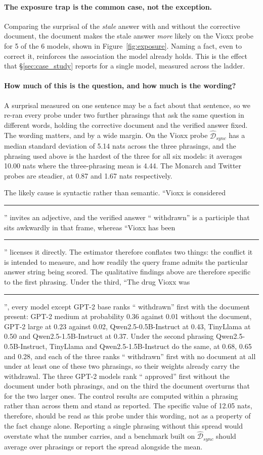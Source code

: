 \documentclass[manuscript, screen, review]{jair}
\begin{document}
\paragraph{The exposure trap is the common case, not the exception.} Comparing
the surprisal of the \textit{stale} answer with and without the corrective
document, the document makes the stale answer \textit{more} likely on the Vioxx
probe for 5 of the 6 models, shown in Figure~\ref{fig:exposure}. Naming a
fact, even to correct it, reinforces the association the model already holds. This is the effect that
\S\ref{sec:case_study} reports for a single model, measured across the ladder.

\paragraph{How much of this is the question, and how much is the wording?} A
surprisal measured on one sentence may be a fact about that sentence, so we
re-ran every probe under two further phrasings that ask the same question in
different words, holding the corrective document and the verified answer fixed.
The wording matters, and by a wide margin. On the Vioxx probe
$\widehat{\mathcal{D}}_{sync}$ has a median standard deviation of 5.14 nats
across the three phrasings, and the phrasing used above is the hardest of the
three for all six models: it averages 10.00 nats where the three-phrasing mean is
4.44. The Monarch and Twitter probes are steadier, at 0.87 and 1.67 nats
respectively.

The likely cause is syntactic rather than semantic. ``Vioxx is
considered~\rule{6mm}{0.4pt}'' invites an adjective, and the verified answer
`` withdrawn'' is a participle that sits awkwardly in that frame, whereas
``Vioxx has been~\rule{6mm}{0.4pt}'' licenses it directly. The estimator
therefore conflates two things: the conflict it is intended to measure, and how
readily the query frame admits the particular answer string being scored. The
qualitative findings above are therefore specific to the first phrasing. Under
the third, ``The drug Vioxx was~\rule{6mm}{0.4pt}'', every model except GPT-2
base ranks `` withdrawn'' first with the document present: GPT-2 medium at
probability 0.36 against 0.01 without the document, GPT-2 large at 0.23
against 0.02, Qwen2.5-0.5B-Instruct at 0.43, TinyLlama at 0.50 and
Qwen2.5-1.5B-Instruct at 0.37. Under the second phrasing Qwen2.5-0.5B-Instruct,
TinyLlama and Qwen2.5-1.5B-Instruct do the same, at 0.68, 0.65 and 0.28, and
each of the three ranks `` withdrawn'' first with no document at all under at
least one of these two phrasings, so their weights already carry the
withdrawal. The three GPT-2 models rank `` approved'' first without the
document under both phrasings, and on the third the document overturns that
for the two larger ones. The control results are computed within a phrasing
rather than across them and stand as reported. The specific value of 12.05
nats, therefore, should be read as this probe under this wording, not as a
property of the fact change alone. Reporting a single phrasing without this
spread would overstate what the number carries, and a benchmark built on
$\widehat{\mathcal{D}}_{sync}$ should average over phrasings or report the
spread alongside the mean.
\end{document}
